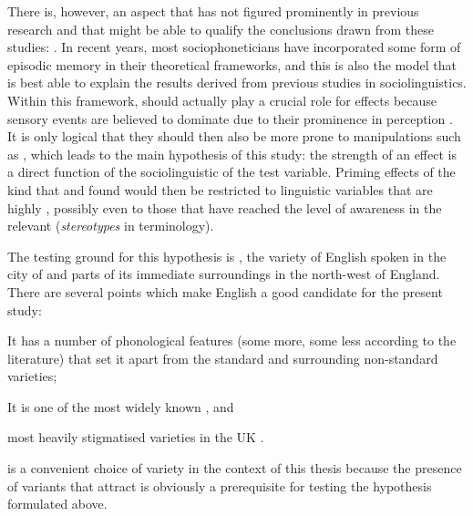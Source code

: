 There is, however, an aspect that has not figured prominently in previous research and that might be able to qualify the conclusions drawn from these studies: .
In recent years, most sociophoneticians have incorporated some form of episodic memory in their theoretical frameworks, and this is also the model that is best able to explain the results derived from previous  studies in sociolinguistics.
Within this framework,  should actually play a crucial role for  effects because  sensory events are believed to dominate  due to their prominence in perception \parencite[cf.][]{pierrehumbert2006}.
It is only logical that they should then also be more prone to manipulations such as , which leads to the main hypothesis of this study: the strength of an   effect is a direct function of the sociolinguistic  of the test variable.
Priming effects of the kind that \textcite{niedzielski1999} and \textcite{hayetal2006a} found would then be restricted to linguistic variables that are highly , possibly even to those that have reached the level of  awareness in the relevant  (\emph{stereotypes} in  terminology).

The testing ground for this hypothesis is , the variety of English spoken in the city of  and parts of its immediate surroundings in the north-west of England.
There are several points which make  English a good candidate for the present study:
\begin{inparaenum}[(1)]
	\item It has a number of phonological features (some more, some less  according to the literature) that set it apart from the standard and surrounding non-standard varieties;
	\item It is one of the most widely known \parencite[cf.][]{trudgill1999}, and
	\item most heavily stigmatised varieties in the UK \parencite[cf.][]{montgomery2007}.
\end{inparaenum}
 is a convenient choice of variety in the context of this thesis because the presence of variants that attract  is obviously a prerequisite for testing the hypothesis formulated above.

